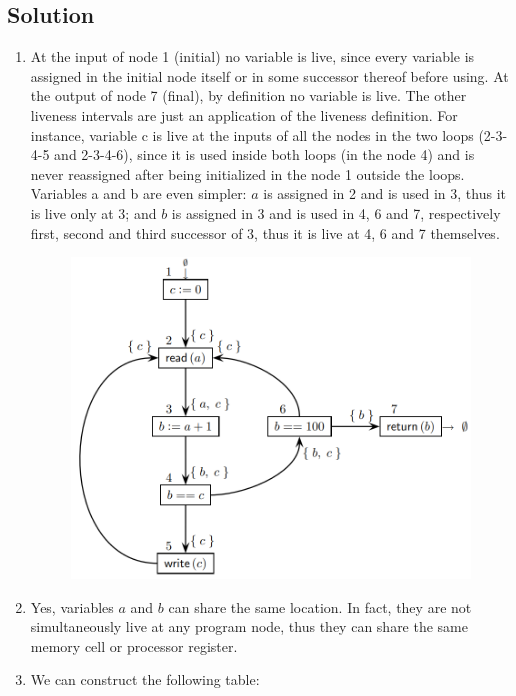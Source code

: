 \documentclass[12pt, a4paper]{report}
\newtheorem[style=M,bodystyle=\normalfont]{theorem}{Theorem}
\newtheorem[style=M,bodystyle=\normalfont]{corollary}{Corollary}
\newtheorem[style=M,bodystyle=\normalfont]{lemma}{Lemma}
\newtheorem[style=M,bodystyle=\normalfont]{definition}{Definition}
\begin{document}
    \subsection*{Solution}
        \begin{enumerate}
            \item At the input of node 1 (initial) no variable is live, since every variable is assigned in the initial node itself or in some successor thereof before using.
                At the output of node 7 (final), by definition no variable is live. The other liveness intervals are just an application of the liveness definition. 
                For instance, variable c is live at the inputs of all the nodes in the two loops (2-3-4-5 and 2-3-4-6), since it is used inside both loops (in the node 4) 
                and is never reassigned after being initialized in the node 1 outside the loops. Variables a and b are even simpler: $a$ is assigned in 2 and is used in 3,
                thus it is live only at 3; and $b$ is assigned in 3 and is used in 4, 6 and 7, respectively first, second and third successor of 3, thus it is live at 4, 6 
                and 7 themselves.
                \begin{figure}[H]
                    \centering
                    \includegraphics[width=0.75\linewidth]{images/CFGlive.png}
                \end{figure} 
            \item Yes, variables $a$ and $b$ can share the same location. In fact, they are not simultaneously live at any program node, thus they can share the same 
                memory cell or processor register.
            \item We can construct the following table: 
                \begin{table}[H]

\end{table}
\end{enumerate}
\end{document}
